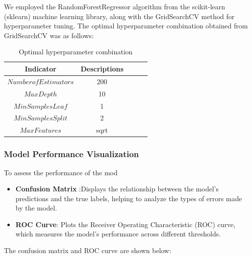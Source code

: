 \documentclass{mcmthesis}
\begin{document}
    We employed the RandomForestRegressor algorithm from the scikit-learn (sklearn) machine learning library, along with the GridSearchCV method for hyperparameter tuning. The optimal hyperparameter combination obtained from GridSearchCV was as follows:

    \begin{table}[h] 
        \centering  
        \caption{Optimal hyperparameter combination}  
        \label{tab1} 
    \begin{tabular}{ccccc} 
        \toprule
        Indicator  & Descriptions \\    
        \midrule 
        $Number of Estimators$ & 200\\
        $Max Depth$ & 10\\
        $Min Samples Leaf$   & 1 \\
        $Min Samples Split$ & 2\\
        $Max Features$ & sqrt\\
        \bottomrule
    \end{tabular}
    \end{table}

\subsubsection{Model Performance Visualization}

    To assess the performance of the mod

\begin{itemize}   
    \item {\bf Confusion Matrix} :Displays the relationship between the model's predictions and the true labels, helping to analyze the types of errors made by the model.
    \item {\bf ROC Curve}: Plots the Receiver Operating Characteristic (ROC) curve, which measures the model's performance across different thresholds.
\end{itemize} 

    The confusion matrix and ROC curve are shown below:
\end{document}
